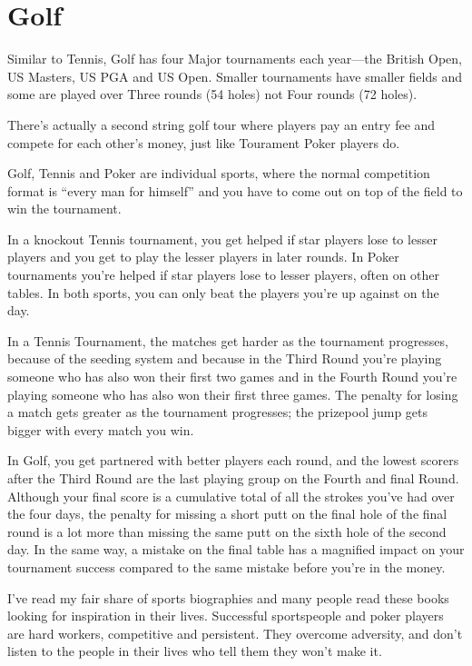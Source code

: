 \section{Golf}

Similar to Tennis, Golf has four Major tournaments each
year---the British Open, US Masters, US PGA and US Open. Smaller
tournaments have smaller fields and some are played over
Three rounds (54 holes) not Four rounds (72 holes).

There's actually a second string golf tour where players pay an
entry fee and compete for each other's money, just like
Tourament Poker players do.

Golf, Tennis and Poker are individual sports, where
the normal competition format is ``every man for himself'' and
you have to come out on top of the field to win the tournament.

In a knockout Tennis tournament, you get helped
if star players lose to lesser players and you get to play the
lesser players in later rounds. In Poker tournaments you're
helped if star players lose to lesser players, often on other
tables. In both sports, you can only beat the players you're
up against on the day.

In a Tennis Tournament, the matches get harder as the tournament
progresses, because of the seeding system and because in the Third
Round you're playing someone who has also won their first two games
and in  the Fourth Round you're playing someone who has also won their
first three games. The penalty for losing a match gets greater as the
tournament progresses; the prizepool jump gets bigger with every match
you win.

In Golf, you get partnered with better players each round, and the
lowest scorers after the Third Round are the last playing group on the
Fourth and final Round. Although your final score is a cumulative
total of all the strokes you've had over the four days, the penalty
for missing a short putt on the final hole of the final round is a lot
more than missing the same putt on the sixth hole of the second day.
In the same way, a mistake on the final table has a magnified impact
on your tournament success compared to the same mistake before you're
in the money.


I've read my fair share of sports biographies and many people read
these books looking for inspiration in their lives. Successful
sportspeople and poker players are hard workers, competitive and
persistent. They overcome adversity, and don't listen to the
people in their lives who tell them they won't make it.
